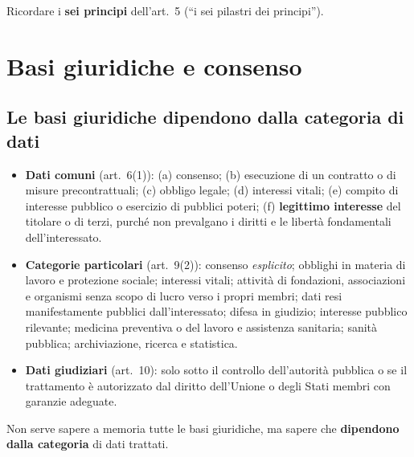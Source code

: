 \begin{esame}
Ricordare i \textbf{sei principi} dell'art.~5 (``i sei pilastri dei principi'').
\end{esame}

\section{Basi giuridiche e consenso}
\label{sec:gdpr-basi}

\subsection{Le basi giuridiche dipendono dalla categoria di dati}
\begin{itemize}
  \item \textbf{Dati comuni} (art.~6(1)): (a) consenso; (b) esecuzione di un contratto o di misure
    precontrattuali; (c) obbligo legale; (d) interessi vitali; (e) compito di interesse pubblico o
    esercizio di pubblici poteri; (f) \textbf{legittimo interesse} del titolare o di terzi, purché non
    prevalgano i diritti e le libertà fondamentali dell'interessato.
  \item \textbf{Categorie particolari} (art.~9(2)): consenso \emph{esplicito}; obblighi in materia di
    lavoro e protezione sociale; interessi vitali; attività di fondazioni, associazioni e organismi senza
    scopo di lucro verso i propri membri; dati resi manifestamente pubblici dall'interessato; difesa in
    giudizio; interesse pubblico rilevante; medicina preventiva o del lavoro e assistenza sanitaria;
    sanità pubblica; archiviazione, ricerca e statistica.
  \item \textbf{Dati giudiziari} (art.~10): solo sotto il controllo dell'autorità pubblica o se il
    trattamento è autorizzato dal diritto dell'Unione o degli Stati membri con garanzie adeguate.
\end{itemize}
Non serve sapere a memoria tutte le basi giuridiche, ma sapere che \textbf{dipendono dalla categoria} di
dati trattati.

